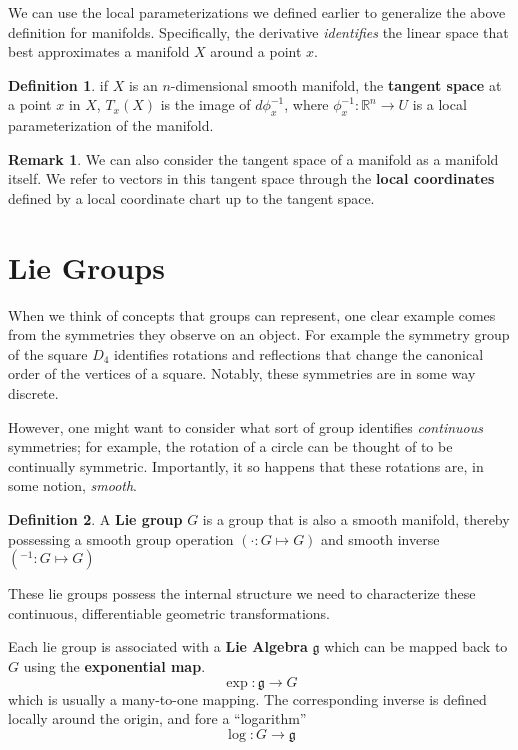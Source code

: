 \documentclass[reqno]{amsart}
\theoremstyle{definition}
\newtheorem{defn}{Definition}[section]
\newtheorem{rem}{Remark}[section]
\numberwithin{equation}{section}
\begin{document}
We can use the local parameterizations we defined earlier to generalize the above definition for manifolds. Specifically, the derivative \textit{identifies} the linear space that best approximates a manifold $X$ around a point $x$.

\begin{defn}
    if $X$ is an $n$-dimensional smooth manifold, the \textbf{tangent space} at a point $x$ in $X$, $T_x(X)$ is the image of $d\phi^{-1}_x$, where $\phi^{-1}_x : \mathbb{R}^n \to U$ is a local parameterization of the manifold.
\end{defn}

\begin{rem}
    We can also consider the tangent space of a manifold as a manifold itself. We refer to vectors in this tangent space through the \textbf{local coordinates} defined by a local coordinate chart up to the tangent space.
\end{rem}

\section{Lie Groups}

When we think of concepts that groups can represent, one clear example comes from the symmetries they observe on an object. For example the symmetry group of the square $D_4$ identifies rotations and reflections that change the canonical order of the vertices of a square. Notably, these symmetries are in some way discrete.

However, one might want to consider what sort of group identifies \textit{continuous} symmetries; for example, the rotation of a circle can be thought of to be continually symmetric. Importantly, it so happens that these rotations are, in some notion, \textit{smooth}.

\begin{defn}
    A \textbf{Lie group} $G$ is a group that is also a smooth manifold, thereby possessing a smooth group operation $(\cdot : G \mapsto G)$ and smooth inverse $(^{-1} : G \mapsto G)$
\end{defn}

These lie groups possess the internal structure we need to characterize these continuous, differentiable geometric transformations.

Each lie group is associated with a \textbf{Lie Algebra} $\mathfrak{g}$ which can be mapped back to $G$ using the \textbf{exponential map}.
\begin{equation*}
    \exp : \mathfrak{g} \to G 
\end{equation*}
which is usually a many-to-one mapping. The corresponding inverse is defined locally around the origin, and fore a ``logarithm''
\begin{equation*}
    \log : G \to \mathfrak{g}
\end{equation*}
\end{document}
